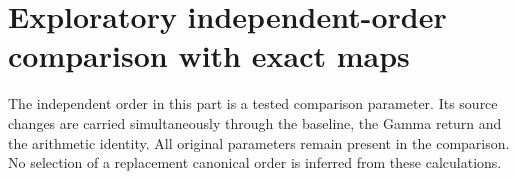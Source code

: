 \documentclass[11pt,a4paper]{article}
\begin{document}
\clearpage
\part{Exploratory independent-order comparison with exact maps}
The independent order in this part is a tested comparison parameter.
Its source changes are carried simultaneously through the baseline,
the Gamma return and the arithmetic identity. All original parameters
remain present in the comparison. No selection of a replacement
canonical order is inferred from these calculations.

\clearpage

\clearpage

\clearpage

\end{document}

